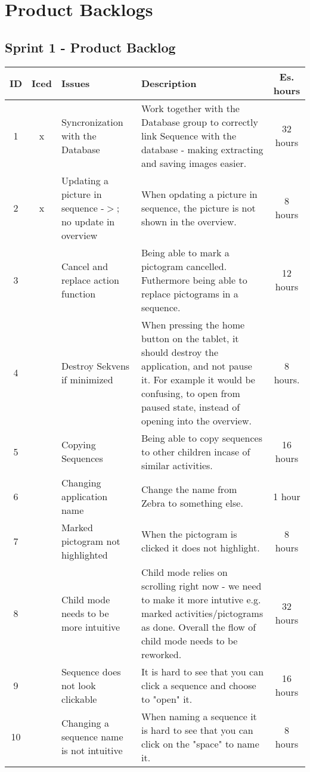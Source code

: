 \chapter{Product Backlogs}\label{app:productbacklog}
\section{Sprint 1 - Product Backlog}
\begin{longtable} { | c | c | p{5cm} | p{5cm} | c | } 
\hline
	ID 	&	Iced	&	Issues	&	Description		&	 Es. hours \\\hline
	1	& 	x	&	Syncronization with the Database		& 	Work together with the Database group to correctly link Sequence with the database - making extracting and saving images easier.	&	32 hours	\\\hline
	2	& 	x	&	Updating a picture in sequence -$>$; no update in overview	&	When opdating a picture in sequence, the picture is not shown in the overview.	&	8 hours	\\\hline
	3	& 		&	Cancel and replace action function	&	Being able to mark a pictogram cancelled. Futhermore being able to replace pictograms in a sequence.	&	12 hours \\\hline
	4	& 		&	Destroy Sekvens if minimized	 &	When pressing the home button on the tablet, it should destroy the application, and not pause it. For example it would be confusing, to open from paused state, instead of opening into the overview.	&	8 hours.	\\\hline
	5	& 		&	Copying Sequences	&	Being able to copy sequences to other children incase of similar activities.	&	16 hours \\\hline
	6	& 		&	Changing application name	&	Change the name from Zebra to something else.	&	1 hour	\\\hline
	7	& 		&	Marked pictogram not highlighted		&	When the pictogram is clicked it does not highlight.	&	8 hours 	\\\hline
	8	& 		&	Child mode needs to be more intuitive		&	Child mode relies on scrolling right now - we need to make it more intutive e.g. marked activities/pictograms as done. Overall the flow of child mode needs to be reworked.	&	32 hours	\\\hline
	9	& 		&	Sequence does not look clickable		&	It is hard to see that you can click a sequence and choose to "open" it.	&	16 hours	\\\hline
	10	& 		&	Changing a sequence name is not intuitive	&	When naming a sequence it is hard to see that you can click on the "space" to name it.	&	8 hours	\\\hline

\end{longtable}
